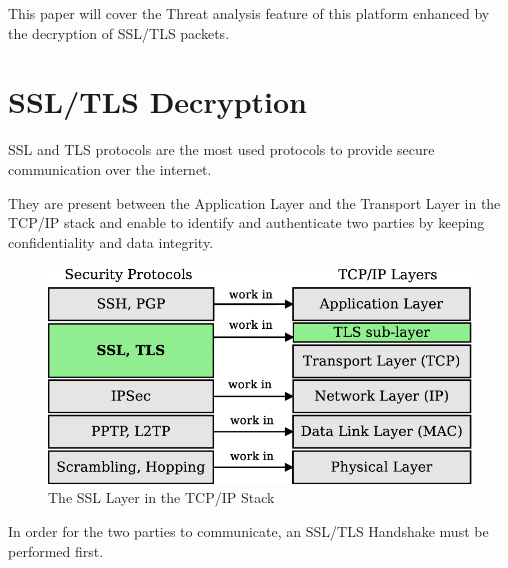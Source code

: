 This paper will cover the Threat analysis feature of this platform enhanced by the decryption of SSL/TLS packets.

\newpage

\section{SSL/TLS Decryption}

SSL and TLS protocols are the most used protocols to provide secure communication over the internet.

They are present between the Application Layer and the Transport Layer in the TCP/IP stack and enable to identify and authenticate two parties by keeping confidentiality and data integrity.

\begin{figure}[!hb]
    \centering
    \includegraphics[width=13cm]{img/ssl-stack.png}
    \caption{The SSL Layer in the TCP/IP Stack}
    \label{SSL Layer}
\end{figure}


\newpage

In order for the two parties to communicate, an SSL/TLS Handshake must be performed first.


